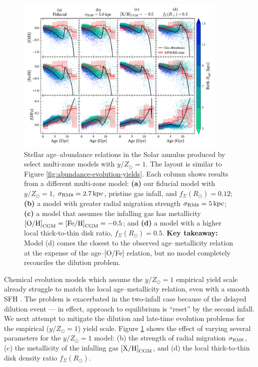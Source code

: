 \documentclass[twocolumn,twocolappendix,linenumbers]{aastex631}
\newcommand{\mathXH}{{\rm [X/H]}}
\newcommand{\mathOH}{{\rm [O/H]}}
\newcommand{\mathFeH}{{\rm [Fe/H]}}
\newcommand{\yZ}[1]{$y/Z_\odot=#1$}
\newcommand{\kpc}{\,{\rm kpc}}
\begin{document}
\begin{figure}
    \centering
    \includegraphics[width=0.9\textwidth]{figures/abundance_evolution_params.pdf}
    \caption{Stellar age--abundance relations in the Solar annulus produced by select multi-zone models with \yZ{1}. The layout is similar to Figure \ref{fig:abundance-evolution-yields}. Each column shows results from a different multi-zone model: {\bf (a)} our fiducial model with $y/Z_\odot=1$, $\sigma_{\rm RM8}=2.7\kpc$, pristine gas infall, and $f_\Sigma(R_\odot)=0.12$; {\bf (b)} a model with greater radial migration strength $\sigma_{\rm RM8}=5\kpc$; {\bf (c)} a model that assumes the infalling gas has metallicity $\mathOH_{\rm CGM}=\mathFeH_{\rm CGM}=-0.5$; and {\bf (d)} a model with a higher local thick-to-thin disk ratio, $f_\Sigma(R_\odot)=0.5$. {\bf Key takeaway:} Model (d) comes the closest to the observed age--metallicity relation at the expense of the age--[O/Fe] relation, but no model completely reconciles the dilution problem.}
    \label{fig:abundance-evolution-params}
\end{figure}

Chemical evolution models which assume the \yZ{1} empirical yield scale already struggle to match the local age--metallicity relation, even with a smooth SFH \citep[see also][]{johnson_milky_2024}. The problem is exacerbated in the two-infall case because of the delayed dilution event --- in effect, approach to equilibrium is ``reset'' by the second infall. We next attempt to mitigate the dilution and late-time evolution problems for the empirical (\yZ{1}) yield scale. 
Figure \ref{fig:abundance-evolution-params} shows the effect of varying several parameters for the \yZ{1} model: (b) the strength of radial migration $\sigma_{\rm RM8}$, (c) the metallicity of the infalling gas $\mathXH_{\rm CGM}$, and (d) the local thick-to-thin disk density ratio $f_\Sigma(R_\odot)$.
\end{document}
